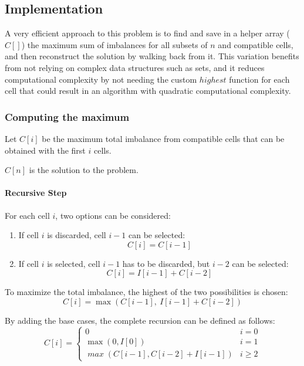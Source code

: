 \subsection{Implementation}

A very efficient approach to this problem is to find and save in a helper array ($C[]$) the maximum sum of imbalances for all subsets of $n$ and compatible cells, and then reconstruct the solution by walking back from it. This variation benefits from not relying on complex data structures such as sets, and it reduces computational complexity by not needing the custom $\mathit{highest}$ function for each cell that could result in an algorithm with quadratic computational complexity.

\subsubsection{Computing the maximum}
Let $C[i]$ be the maximum total imbalance from compatible cells that can be obtained with the first $i$ cells.

$C[n]$ is the solution to the problem.

\paragraph{Recursive Step}

For each cell $i$, two options can be considered:
\begin{enumerate}
    \item If cell $i$ is discarded, cell $i-1$ can be selected:
          \[
              C[i]=C[i-1]
          \]

    \item If cell $i$ is selected, cell $i-1$ has to be discarded, but $i-2$ can be selected:
          \[
              C[i]=I[i-1]+C[i-2]
          \]
\end{enumerate}

To maximize the total imbalance, the highest of the two possibilities is chosen:
\[
    C[i]=\max(C[i-1],\ I[i-1] + C[i-2])
\]

By adding the base cases, the complete recursion can be defined as follows:
\[
    C[i] = \begin{cases}
        0                                      & i=0      \\
        \max(0, I[0])                          & i=1      \\
        \mathit{\max}(C[i-1], C[i-2] + I[i-1]) & i \geq 2
    \end{cases}
\]

